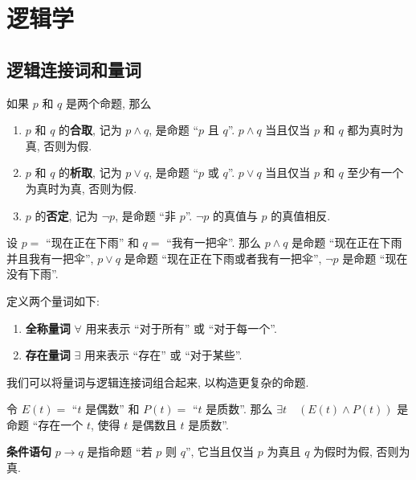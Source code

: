 \chapter{逻辑学}
\section{逻辑连接词和量词}
\begin{definition}
    如果 $p$ 和 $q$ 是两个命题, 那么
    \begin{enumerate}[itemindent=0ex, itemsep=0pt, label=\upshape{(\alph*)}]
        \item $p$ 和 $q$ 的\textbf{合取}, 记为 $p \wedge q$, 是命题 ``$p$ 且 $q$''. $p \wedge q$ 当且仅当 $p$ 和 $q$ 都为真时为真, 否则为假. 
        \item $p$ 和 $q$ 的\textbf{析取}, 记为 $p \vee q$, 是命题 ``$p$ 或 $q$''. $p \vee q$ 当且仅当 $p$ 和 $q$ 至少有一个为真时为真, 否则为假.
        \item $p$ 的\textbf{否定}, 记为 $\neg p$, 是命题 ``非 $p$''. $\neg p$ 的真值与 $p$ 的真值相反. 
    \end{enumerate}
\end{definition}

\begin{example}
    设 $p=$ ``现在正在下雨'' 和 $q=$ ``我有一把伞''. 那么 $p \wedge q$ 是命题 ``现在正在下雨并且我有一把伞'', $p \vee q$ 是命题 ``现在正在下雨或者我有一把伞'', $\neg p$ 是命题 ``现在没有下雨''.
\end{example}

\begin{definition}
    定义两个量词如下:
    \begin{enumerate}[itemindent=0ex, itemsep=0pt, label=\upshape{(\alph*)}]
        \item \textbf{全称量词} $\forall$ 用来表示 ``对于所有'' 或 ``对于每一个''.
        \item \textbf{存在量词} $\exists$ 用来表示 ``存在'' 或 ``对于某些''.
    \end{enumerate}
\end{definition}

我们可以将量词与逻辑连接词组合起来, 以构造更复杂的命题.

\begin{example}
    令 $E(t)=$ ``$t$ 是偶数'' 和 $P(t)=$ ``$t$ 是质数''. 那么 $\exists t\quad (E(t) \wedge P(t))$ 是命题 ``存在一个 $t$, 使得 $t$ 是偶数且 $t$ 是质数''.
\end{example}

\begin{definition}
    \textbf{条件语句} $p \rightarrow q$ 是指命题 ``若 $p$ 则 $q$'', 它当且仅当 $p$ 为真且 $q$ 为假时为假, 否则为真.
\end{definition}

